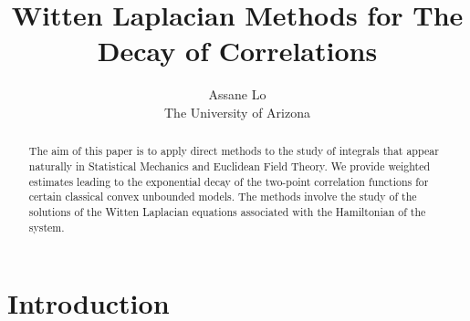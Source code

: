 \documentclass{article}
\begin{document}
\title{Witten Laplacian Methods for The Decay of Correlations}
\author{Assane Lo \\
The University of Arizona}
\maketitle

\begin{abstract}
The aim of this paper is to apply direct methods to the study of integrals
that appear naturally in Statistical Mechanics and Euclidean Field Theory.
We provide weighted estimates leading to the exponential decay of the
two-point correlation functions for certain classical convex unbounded
models. The methods involve the study of the solutions of the Witten
Laplacian equations associated with the Hamiltonian of the system.
\end{abstract}

\section{Introduction}
\end{document}
